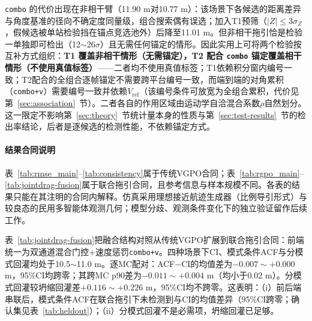 \documentclass[UTF8,a4paper,zihao=-4]{ctexart}
\begin{document}
\texttt{combo} 的代价出现在非相干臂（11.90 m对10.77 m）：该场景下各候选的距离差异与角度基准的径向不确定度同量级，组合搜索偶有误选；加入T1预筛（\(|Z|\le3\sigma_Z\)，假候选被单站检验挡在锚点竞选池外）后降至11.01 m。但非相干拖引恰是检验一单独即可检出（12\(\sim\)26\(\sigma\)）且无需任何锚定的情形。因此实用上可将两个检验按互补方式组织：\textbf{T1 覆盖非相干情形（无需锚定），T2 配合 \texttt{combo} 锚定覆盖相干情形（不使用真值标签）}——二者均不使用真值标签；T1依赖积分窗内编号一致；T2配合的全组合逐帧锚定不需要跨平台编号一致，而端到端的对角累积（\texttt{combo+v}）需要编号一致并依赖\(V_{\mathrm{ref}}\)（该编号条件可放宽为全组合累积，代价见第~\ref{sec:association}~节）。二者各自的作用区域由运动学自洽混合系数\(\rho\)自然划分。这一限定不影响第~\ref{sec:theory}~节统计量本身的性质与第~\ref{sec:test-results}~节的检出率结论，后者是逐候选的检测性能，不依赖锚定方式。



\paragraph{结果合同说明} 表~\ref{tab:rmse_main}--\ref{tab:consistency}属于传统VGPO合同；表~\ref{tab:rgpo_main}--\ref{tab:jointdrag-fusion}属于联合拖引合同，且参考信息与样本规模不同。各表的结果只能在其注明的合同内解释。仿真采用理想接近航迹生成器（比例导引形式）与较良态的民用多智能体观测几何；模型分歧、观测条件变化下的独立验证留作后续工作。



表~\ref{tab:jointdrag-fusion}把融合结构对照从传统VGPO扩展到联合拖引合同：前端统一为双通道混合门控+速度惩罚\texttt{combo+v}。四种场景下CI、模式条件ACF与分模式回灌均处于10.5\(\sim\)11.0 m。逐MC配对：ACF$-$CI的均值差为$-0.007\sim+0.000$ m，95\%CI均跨零；其跨MC p90差为$-0.011\sim+0.004$ m（均小于0.02 m）。分模式回灌较坍缩回灌差$+0.116\sim+0.226$ m，95\%CI均不跨零。这表明：（i）前后端串联后，模式条件ACF在联合拖引下未检测到与CI的均值差异（95\%CI跨零；确认集见表~\ref{tab:heldout}）；（ii）分模式回灌不是必需项，坍缩回灌已足够。
\end{document}
